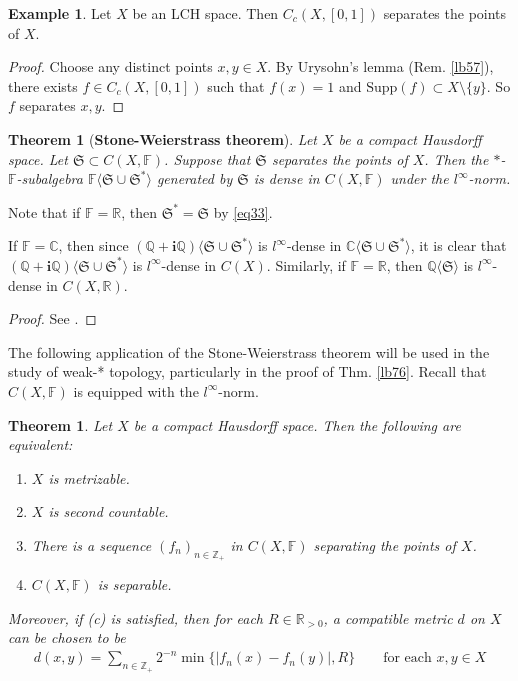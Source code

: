 \documentclass[12pt,b5paper,notitlepage]{article}
\theoremstyle{definition}
\newtheorem{eg}[df]{Example}
\theoremstyle{plain}
\newtheorem{thm}[df]{Theorem}
\newcommand{\fk}{\mathfrak}
\newcommand{\bk}[1]{\langle {#1}\rangle}
\newcommand{\im}{\mathbf{i}}
\newcommand{\Cbb}{\mathbb C}
\newcommand{\Zbb}{\mathbb Z}
\newcommand{\Qbb}{\mathbb Q}
\newcommand{\Rbb}{\mathbb R}
\newcommand{\Supp}{\mathrm{Supp}}
\newcommand{\Fbb}{\mathbb F}
\numberwithin{equation}{section}
\begin{document}
\begin{eg}\label{lb58}
Let $X$ be an LCH space. Then $C_c(X,[0,1])$ separates the points of $X$.
\end{eg}

\begin{proof}
Choose any distinct points $x,y\in X$. By Urysohn's lemma (Rem. \ref{lb57}), there exists $f\in C_c(X,[0,1])$ such that $f(x)=1$ and $\Supp(f)\subset X\setminus\{y\}$. So $f$ separates $x,y$.
\end{proof}

\begin{thm}[\textbf{Stone-Weierstrass theorem}]\label{lb87}
Let $X$ be a compact Hausdorff space. Let $\fk S\subset C(X,\Fbb)$. Suppose that $\fk S$ separates the points of $X$. Then the $*$-$\Fbb$-subalgebra $\Fbb\bk{\fk S\cup\fk S^*}$ generated by $\fk S$ is dense in $C(X,\Fbb)$ under the $l^\infty$-norm.
\end{thm}

Note that if $\Fbb=\Rbb$, then $\fk S^*=\fk S$ by \eqref{eq33}.

If $\Fbb=\Cbb$, then since $(\Qbb+\im\Qbb)\bk{\fk S\cup\fk S^*}$ is $l^\infty$-dense in $\Cbb\bk{\fk S\cup\fk S^*}$, it is clear that $(\Qbb+\im\Qbb)\bk{\fk S\cup\fk S^*}$ is $l^\infty$-dense in $C(X)$. Similarly, if $\Fbb=\Rbb$, then $\Qbb\bk{\fk S}$ is $l^\infty$-dense in $C(X,\Rbb)$.

\begin{proof}
See \cite[Ch. 15]{Gui-A}.
\end{proof}




The following application of the Stone-Weierstrass theorem will be used in the study of weak-* topology, particularly in the proof of Thm. \ref{lb76}. Recall that $C(X,\Fbb)$ is equipped with the $l^\infty$-norm.

\begin{thm}\label{lb75}
Let $X$ be a compact Hausdorff space. Then the following are equivalent:
\begin{enumerate}[label=(\alph*)]
\item $X$ is metrizable.
\item $X$ is second countable.
\item There is a sequence $(f_n)_{n\in\Zbb_+}$ in $C(X,\Fbb)$ separating the points of $X$.
\item $C(X,\Fbb)$ is separable.
\end{enumerate}
Moreover, if (c) is satisfied, then for each $R\in\Rbb_{>0}$, a compatible metric $d$ on $X$ can be chosen to be
\begin{gather}\label{eq34}
d(x,y)=\sum_{n\in\Zbb_+}2^{-n}\min\{|f_n(x)-f_n(y)|,R\}\qquad\text{for each }x,y\in X
\end{gather}
\end{thm}
\end{document}

